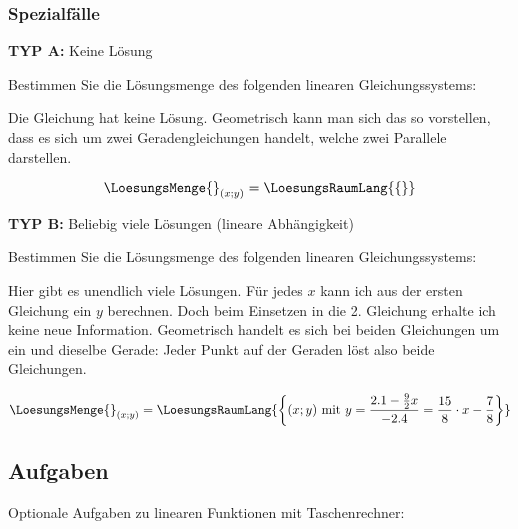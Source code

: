 \subsubsection{Spezialfälle}
\textbf{TYP A:} Keine Lösung

Bestimmen Sie die Lösungsmenge des folgenden linearen Gleichungssystems:


Die Gleichung hat keine Lösung. Geometrisch kann man sich das so vorstellen, dass es sich um zwei Geradengleichungen handelt, welche zwei Parallele darstellen.

$$\LoesungsMenge{}_{(x;y)} = \LoesungsRaumLang{\{\}}$$

\textbf{TYP B:} Beliebig viele Lösungen (lineare Abhängigkeit)

Bestimmen Sie die Lösungsmenge des folgenden linearen Gleichungssystems:


Hier gibt es unendlich viele Lösungen. Für jedes $x$ kann ich aus der ersten Gleichung ein $y$ berechnen. Doch beim Einsetzen in die 2. Gleichung erhalte ich keine neue Information.
Geometrisch handelt es sich bei beiden Gleichungen um ein und dieselbe Gerade: Jeder Punkt auf der Geraden löst also beide Gleichungen.

$$\LoesungsMenge{}_{(x;y)} = \LoesungsRaumLang{
\left\{(x;y) \text{ mit } y = \frac{2.1-\frac92x}{-2.4} =  \frac{15}{8} \cdot{} x - \frac78\right\} }$$

\newpage


\subsection*{Aufgaben}

Optionale Aufgaben zu linearen Funktionen mit Taschenrechner:

\newpage

